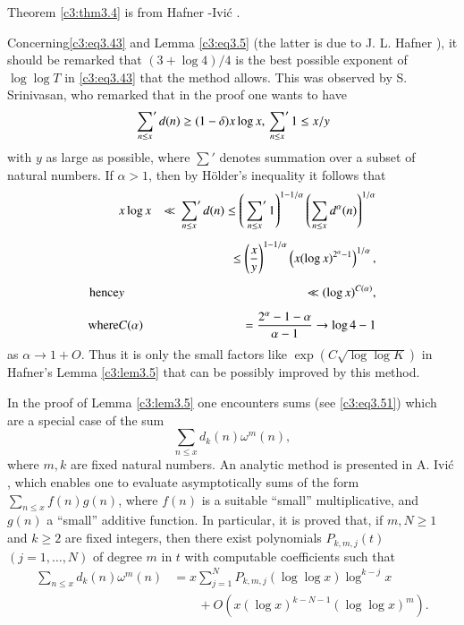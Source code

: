 Theorem \ref{c3:thm3.4} is from Hafner -Ivi\'c \cite{ Hafner and Ivic1}.

Concerning\pageoriginale \eqref{c3:eq3.43} and Lemma \eqref{c3:eq3.5}
(the latter is due to J. L. Hafner \cite{Hafner1}), it should be remarked
that $(3+ \log 4)/4$ is the best possible exponent of $\log \log T$ in
\eqref{c3:eq3.43} that the method allows. This was observed by
S. Srinivasan, who remarked that in the proof one wants to have
$$
\sideset{}{'}\sum_{n \leq x} d(n)\geq (1- \delta) x\log x,
\sideset{}{'}\sum_{n \leq x} 1 \leq x/y 
$$ 
with $y$ as large as possible, where $\sum'$ denotes summation over a
subset of natural numbers. If $\alpha>1$, then by H\"older's
inequality it follows that
\begin{eqnarray*}
  & x \log x & \ll \sideset{}{'}\sum_{n \leq x}d (n) \leq \left(
  \sideset{}{'}\sum_{n \leq x} 1 \right)^{1-1/\alpha} \left(\sum_{n
    \leq x} d^\alpha (n) \right)^{1/\alpha}\\[5pt]
  & & \leq \left(\frac{x}{y} \right)^{1-1/\alpha} \left(x (\log
  x)^{2^\alpha-1}\right)^{1/\alpha},\\[5pt]
  \text{hence} & y & \ll (\log x)^{C(\alpha)},\\[5pt]
  \text{where}& C(\alpha) & = \frac{2^\alpha  -1 -\alpha}{\alpha-1}
  \to \log 4 -1
\end{eqnarray*}
as $\alpha \to 1 + O$. Thus it is only the small factors like $\exp
(C\sqrt{\log \log K})$ in Hafner's Lemma \ref{c3:lem3.5} that can be
possibly improved by this method.

In the proof of Lemma \ref{c3:lem3.5} one encounters sums (see
\eqref{c3:eq3.51}) which are a special case of the sum
$$
\sum_{n \leq x}d_k (n) \omega^m (n),
$$
where $m, k$ are fixed natural numbers. An analytic method is
presented in A. Ivi\'c \cite{Ivic2}, which enables one to evaluate
asymptotically sums of the form $\sum_{n \leq x} f (n)
  g(n)$, where $f(n)$ is a suitable ``small'' multiplicative, and
$g(n)$ a ``small'' additive function. In particular, it is proved
that, if $m, N\geq 1$ and $k \geq 2$ are fixed integers, then there
exist polynomials $P_{k, m, j}(t)$ $(j=1, \ldots , N)$ of degree $m$
in $t$ with computable coefficients such that
\begin{align*}
  \sum_{n \leq x}d_k (n) \omega^m (n) &= x \sum_{j=1}^N P_{k, m , j}
  (\log \log x) \log^{k-j}x\\ 
  &\qquad + O\left(x (\log x)^{k- N-1} (\log \log x)^m\right).
\end{align*}

